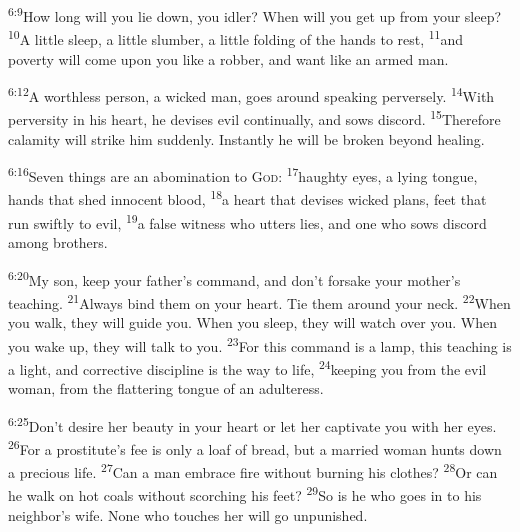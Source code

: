 \documentclass[openany,12pt,english]{book}
\newenvironment{para}{\par\pretolerance=100\tolerance=200\setlength{\emergencystretch}{0.6em}\relax}{\par}
\begin{document}
\begin{para}
    \textsuperscript{6:9}\thinspace{}How long will you lie down, you i\-dler? When will you get up from your sleep?
    \textsuperscript{10}\thinspace{}A lit\-tle sleep, a lit\-tle slum\-ber, a lit\-tle folding of the hands to rest,
    \textsuperscript{11}\thinspace{}and pov\-er\-ty will come up\-on you like a rob\-ber, and want like an armed man.
\end{para}

\begin{para}
    \textsuperscript{6:12}\thinspace{}A worth\-less per\-son, a wick\-ed man, goes a\-round speak\-ing per\-verse\-ly.
    \textsuperscript{14}\thinspace{}With per\-ver\-si\-ty in his heart, he devises evil con\-tin\-u\-al\-ly, and sows dis\-cord.
    \textsuperscript{15}\thinspace{}There\-fore ca\-lam\-i\-ty will strike him sud\-den\-ly. In\-stant\-ly he will be bro\-ken be\-yond heal\-ing.
\end{para}

\begin{para}
    \textsuperscript{6:16}\thinspace{}Sev\-en things are an a\-bom\-i\-na\-tion to \textsc{God}:
    \textsuperscript{17}\thinspace{}haugh\-ty eyes, a ly\-ing tongue, hands that shed in\-no\-cent blood,
    \textsuperscript{18}\thinspace{}a heart that devises wick\-ed plans, feet that run swift\-ly to evil,
    \textsuperscript{19}\thinspace{}a false wit\-ness who utters lies, and one who sows dis\-cord a\-mong brothers.
\end{para}

\begin{para}
    \textsuperscript{6:20}\thinspace{}My son, keep your father's com\-mand, and don't for\-sake your mother's teach\-ing.
    \textsuperscript{21}\thinspace{}Al\-ways bind them on your heart. Tie them a\-round your neck.
    \textsuperscript{22}\thinspace{}When you walk, they will guide you. When you sleep, they will watch o\-ver you. When you wake up, they will talk to you.
    \textsuperscript{23}\thinspace{}For this com\-mand is a lamp, this teach\-ing is a light, and cor\-rec\-tive dis\-ci\-pline is the way to life,
    \textsuperscript{24}\thinspace{}keep\-ing you from the evil wom\-an, from the flattering tongue of an a\-dul\-ter\-ess.
\end{para}

\begin{para}
    \textsuperscript{6:25}\thinspace{}Don't de\-sire her beau\-ty in your heart or let her cap\-ti\-vate you with her eyes.
    \textsuperscript{26}\thinspace{}For a prostitute's fee is on\-ly a loaf of bread, but a mar\-ried wom\-an hunts down a pre\-cious life.
    \textsuperscript{27}\thinspace{}Can a man em\-brace fire with\-out burn\-ing his clothes?
    \textsuperscript{28}\thinspace{}Or can he walk on hot coals with\-out scorching his feet?
    \textsuperscript{29}\thinspace{}So is he who goes in to his neighbor's wife. None who touches her will go un\-pun\-ished.
\end{para}
\end{document}
